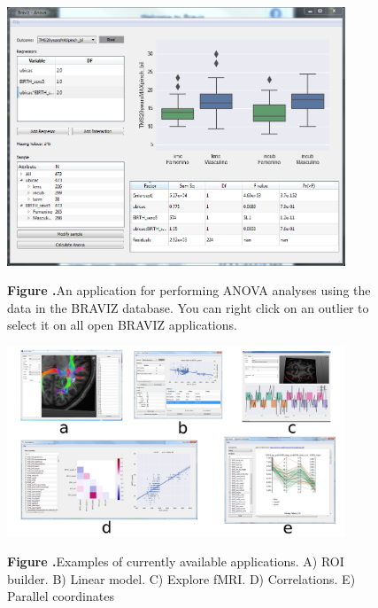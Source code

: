 \documentclass[utf8,paper]{frontiersSCNS} %
\begin{document}
\begin{figure}[h!]
\begin{center}
\includegraphics[width=0.9\textwidth]{figures/anova.PNG}
\end{center}
 \textbf{\label{fig_anova} Figure .}{An application for performing ANOVA analyses using the data in the BRAVIZ database. You can right click on an outlier to select it on all open BRAVIZ applications. }
\end{figure}

\begin{figure}[h!]
\begin{center}
\includegraphics[width=0.9\textwidth]{figures/many_apps.png}
\end{center}
 \textbf{\label{fig_other_apps} Figure .}{Examples of currently available applications. A) ROI builder. B) Linear model. C) Explore fMRI. D) Correlations. E) Parallel coordinates}
\end{figure}
\end{document}
